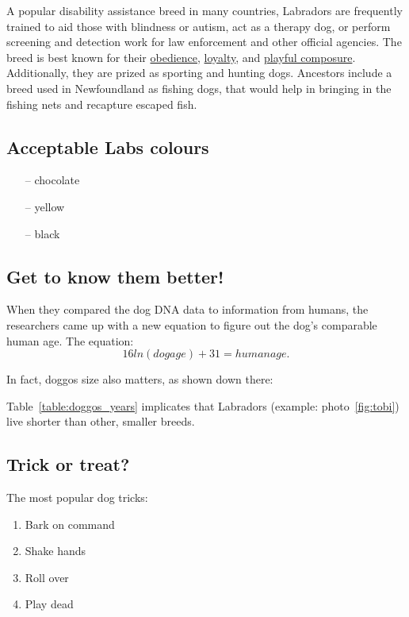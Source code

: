 A popular disability assistance breed in many countries, Labradors are frequently trained to aid those with blindness or autism, act as a therapy dog, or perform screening and detection work for law enforcement and other official agencies. The breed is best known for their \underline{obedience}, \underline{loyalty}, and \underline{playful composure}. Additionally, they are prized as sporting and hunting dogs. Ancestors include a breed used in Newfoundland as fishing dogs, that would help in bringing in the fishing nets and recapture escaped fish.

\subsection{Acceptable Labs colours}
\begin{itemize}
    \item[--] chocolate 
    \item[--] yellow
    \item[--] black
\end{itemize}

\subsection{Get to know them better!}
When they compared the dog DNA data to information from humans, the researchers came up with a new equation to figure out the dog's comparable human age. The equation: 
\[16ln(dogage) + 31 = humanage.\]

In fact, doggos size also matters, as shown down there:


Table~\ref{table:doggos_years} implicates that Labradors (example: photo~\ref{fig:tobi}) live shorter than other, smaller breeds. 

\subsection{Trick or treat?}
The most popular dog tricks:
\begin{enumerate}
  \item Bark on command
  \item Shake hands
  \item Roll over
  \item Play dead
\end{enumerate}